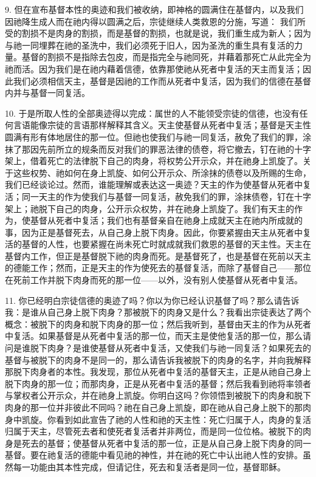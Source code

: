 9. 但在宣布基督本性的奥迹和我们被收纳，即神格的圆满住在基督内，以及我们因祂降生成人而在祂内得以圆满之后，宗徒继续人类救恩的分施，写道： 我们所受的割损不是肉身的割损，而是基督的割损，也就是说，我们重生成为新人；因为与祂一同埋葬在祂的圣洗中，我们必须死于旧人，因为圣洗的重生具有复活的力量。基督的割损不是指除去包皮，而是指完全与祂同死，并藉着那死亡从此完全为祂而活。因为我们是在祂内藉着信德，依靠那使祂从死者中复活的天主而复活；因此我们必须相信天主，基督是因祂的工作而从死者中复活，因为我们的信德在基督内并与基督一同复活。\par

10. 于是所取人性的全部奥迹得以完成：属世的人不能领受宗徒的信德，也没有任何言语能像宗徒的言语那样解释其含义。天主使基督从死者中复活；基督是天主性圆满有形有体地居住的那一位。但祂也使我们与祂一同复活，赦免了我们的罪，涂抹了那因先前所立的规条而反对我们的罪恶法律的债卷，将它撤去，钉在祂的十字架上，借着死亡的法律脱下自己的肉身，将权势公开示众，并在祂身上凯旋了。关于这些权势、祂如何在身上凯旋、如何公开示众、所涂抹的债卷以及所赐的生命，我们已经谈论过。然而，谁能理解或表达这一奥迹？天主的作为使基督从死者中复活；同一天主的作为使我们与基督一同复活，赦免我们的罪，涂抹债卷，钉在十字架上；祂脱下自己的肉身，公开示众权势，并在祂身上凯旋了。我们有天主的作为，使基督从死者中复活；我们也有基督亲自在祂身上成就天主在祂内所成就的事，因为正是基督死去，从自己身上脱下肉身。因此，你要紧握由天主从死者中复活的基督的人性，也要紧握在尚未死亡时就成就我们救恩的基督的天主性。天主在基督内工作，但正是基督脱下祂的肉身而死。是基督死了，也是基督在死前以天主的德能工作；然而，正是天主的作为使死去的基督复活，而除了基督自己——那位在死前工作并脱下肉身而死的那一位——以外，没有别人使基督从死者中复活。\par

11. 你已经明白宗徒信德的奥迹了吗？你以为你已经认识基督了吗？那么请告诉我：是谁从自己身上脱下肉身？那被脱下的肉身又是什么？我看出宗徒表达了两个概念：被脱下的肉身和脱下肉身的那一位；然后我听到，基督由天主的作为从死者中复活。如果基督是从死者中复活的那一位，而天主是使他复活的那一位，那么请问是谁脱下肉身？是谁使基督从死者中复活，又使我们与祂一同复活？如果死去的基督与被脱下的肉身不是同一的，那么请告诉我被脱下的肉身的名字，并向我解释那脱下肉身者的本性。我发现，那位从死者中复活的基督天主，正是从祂自己身上脱下肉身的那一位；而那肉身，正是从死者中复活的基督；然后我看到祂将率领者与掌权者公开示众，并在祂身上凯旋。你明白这吗？你领悟到被脱下的肉身和脱下肉身的那一位并非彼此不同吗？祂在自己身上凯旋，即在祂从自己身上脱下的那肉身中凯旋。你看到如此宣告了祂的人性和祂的天主性：死亡归属于人，肉身的复活归属于天主，尽管死去者和使死者复活者并非两位，而是同一位位格。被脱下的肉身是死去的基督；使基督从死者中复活的那一位，正是从自己身上脱下肉身的同一基督。要在祂复活的德能中看见祂的神性，并在祂的死亡中认出祂人性的安排。虽然每一功能由其本性完成，但请记住，死去和复活者是同一位，基督耶稣。\par

